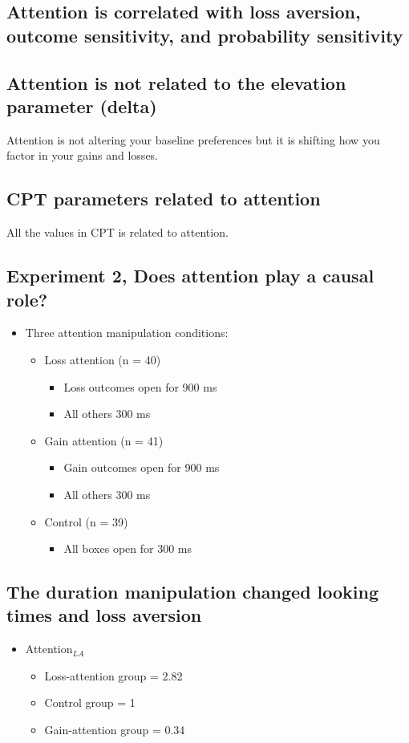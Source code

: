 \subsection{Attention is correlated with loss aversion, outcome sensitivity, and probability sensitivity}
\subsection{Attention is not related to the elevation parameter (delta)}
Attention is not altering your baseline preferences but it is shifting how you factor in your gains and losses.
\subsection{CPT parameters related to attention}
All the values in CPT is related to attention.

\subsection{Experiment 2, Does attention play a causal role?}
\begin{itemize}
    \item Three attention manipulation conditions:
    \begin{itemize}
        \item Loss attention (n = 40)
        \begin{itemize}
            \item Loss outcomes open for 900 ms
            \item All others 300 ms
        \end{itemize}
        \item Gain attention (n = 41)
        \begin{itemize}
            \item Gain outcomes open for 900 ms
            \item All others 300 ms
        \end{itemize}
        \item Control (n = 39)
        \begin{itemize}
            \item All boxes open for 300 ms
        \end{itemize}
    \end{itemize}
\end{itemize}

\subsection{The duration manipulation changed looking times and loss aversion}
\begin{itemize}
    \item Attention$_{LA}$
    \begin{itemize}
        \item Loss-attention group = 2.82
        \item Control group = 1
        \item Gain-attention group = 0.34
    \end{itemize}
\end{itemize}
